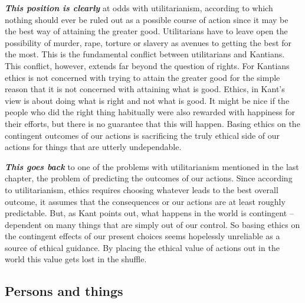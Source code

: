 \documentclass[
  12pt, openany]{book}
\theoremstyle{definition}
\theoremstyle{definition}
\theoremstyle{definition}
\theoremstyle{remark}
\begin{document}
\textbf{\emph{This position is clearly}} at odds with utilitarianism, according to which nothing should ever be ruled out as a possible course of action since it may be the best way of attaining the greater good. Utilitarians have to leave open the possibility of murder, rape, torture or slavery as avenues to getting the best for the most. This is the fundamental conflict between utilitarians and Kantians. This conflict, however, extends far beyond the question of rights. For Kantians ethics is not concerned with trying to attain the greater good for the simple reason that it is not concerned with attaining what is good. Ethics, in Kant's view is about doing what is right and not what is good. It might be nice if the people who did the right thing habitually were also rewarded with happiness for their efforts, but there is no guarantee that this will happen. Basing ethics on the contingent outcomes of our actions is sacrificing the truly ethical side of our actions for things that are utterly undependable.

\textbf{\emph{This goes back}} to one of the problems with utilitarianism mentioned in the last chapter, the problem of predicting the outcomes of our actions. Since according to utilitarianism, ethics requires choosing whatever leads to the best overall outcome, it assumes that the consequences or our actions are at least roughly predictable. But, as Kant points out, what happens in the world is contingent -- dependent on many things that are simply out of our control. So basing ethics on the contingent effects of our present choices seems hopelessly unreliable as a source of ethical guidance. By placing the ethical value of actions out in the world this value gets lost in the shuffle.

\hypertarget{persons-and-things}{%
\subsection*{Persons and things}\label{persons-and-things}}
\end{document}

